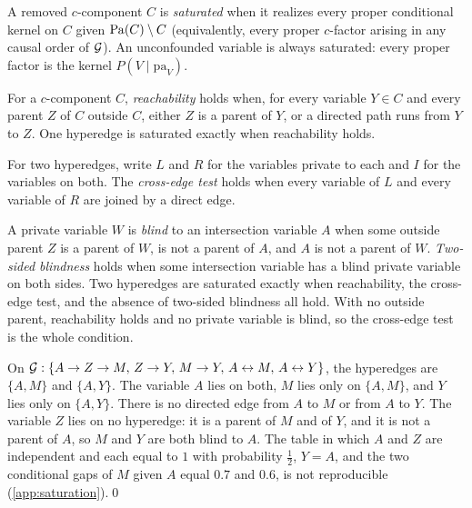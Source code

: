 \begin{definition}[Saturation]
  \label{def:saturation}
  A removed $c$-component $C$ is \emph{saturated} when it realizes every proper conditional kernel on $C$ given $\operatorname{Pa}(C)\setminus C$ (equivalently, every proper $c$-factor arising in any causal order of $\mathcal{G}$). An unconfounded variable is always saturated: every proper factor is the kernel $P(V\mid\mathrm{pa}_V)$.

  For a $c$-component $C$, \emph{reachability} holds when, for every variable $Y\in C$ and every parent $Z$ of $C$ outside $C$, either $Z$ is a parent of $Y$, or a directed path runs from $Y$ to $Z$. One hyperedge is saturated exactly when reachability holds.

  For two hyperedges, write $L$ and $R$ for the variables private to each and $I$ for the variables on both. The \emph{cross-edge test} holds when every variable of $L$ and every variable of $R$ are joined by a direct edge.

  A private variable $W$ is \emph{blind} to an intersection variable $A$ when some outside parent $Z$ is a parent of $W$, is not a parent of $A$, and $A$ is not a parent of $W$. \emph{Two-sided blindness} holds when some intersection variable has a blind private variable on both sides. Two hyperedges are saturated exactly when reachability, the cross-edge test, and the absence of two-sided blindness all hold. With no outside parent, reachability holds and no private variable is blind, so the cross-edge test is the whole condition.
\end{definition}

\begin{example}
  On $\mathcal{G}:\{A\to Z\to M,\, Z\to Y,\, M\to Y,\, A\leftrightarrow M,\, A\leftrightarrow Y\}$, the hyperedges are $\{A,M\}$ and $\{A,Y\}$. The variable $A$ lies on both, $M$ lies only on $\{A,M\}$, and $Y$ lies only on $\{A,Y\}$. There is no directed edge from $A$ to $M$ or from $A$ to $Y$. The variable $Z$ lies on no hyperedge: it is a parent of $M$ and of $Y$, and it is not a parent of $A$, so $M$ and $Y$ are both blind to $A$. The table in which $A$ and $Z$ are independent and each equal to $1$ with probability $\tfrac12$, $Y=A$, and the two conditional gaps of $M$ given $A$ equal $0.7$ and $0.6$, is not reproducible (\cref{app:saturation}).\qed
\end{example}

